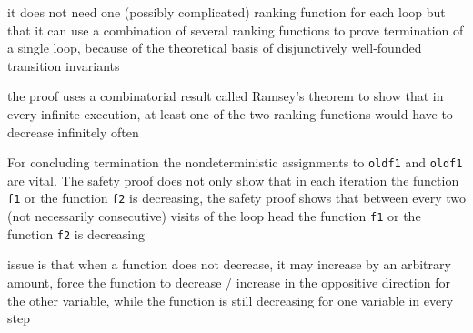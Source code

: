 \documentclass[a4paper]{article}
\begin{document}
\begin{minipage}[t]{0.16\linewidth}
\begin{betterlist}
{{\begin{betterlist}
					\codeone
					\codetwo
					\item it does not need one (possibly complicated) ranking function for each loop but that it can use a combination of several ranking functions to prove termination of a single loop, because of the theoretical basis of disjunctively well-founded transition invariants
					\begin{betterlist}
						\item the proof uses a combinatorial result called Ramsey’s theorem to show that in every infinite execution, at least one of the two ranking functions would have to decrease infinitely often
					\end{betterlist}
					\item For concluding termination the nondeterministic assignments to \texttt{oldf1} and \texttt{oldf1} are vital. The safety proof does not only show that in each iteration the function \texttt{f1} or the function \texttt{f2} is decreasing, the safety proof shows that between every two (not necessarily consecutive) visits of the loop head the function \texttt{f1} or the function \texttt{f2} is decreasing
					\begin{betterlist}
						\item issue is that when a function does not decrease, it may increase by an arbitrary amount, force the function to decrease / increase in the oppositive direction for the other variable, while the function is still decreasing for one variable in every step
					\end{betterlist}


\end{betterlist}}}
\end{betterlist}
\end{minipage}
\end{document}
